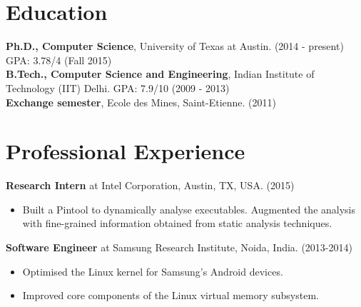 \documentclass[margin]{res}
\begin{document}
 
 
 
\address{Department of Computer Science \\University of Texas at Austin }

\address{+1 512-952-0104 \\ mihir@cs.utexas.edu }

 
\begin{resume} 
 

\section{Education} 
{\bf Ph.D., Computer Science}, University of Texas at Austin. \hfill (2014 - present)\\
GPA: 3.78/4 \hfill (Fall 2015)\\
{\bf B.Tech., Computer Science and Engineering}, Indian Institute of
Technology (IIT) Delhi. GPA: 7.9/10 \hfill (2009 - 2013)\\
{\bf Exchange semester}, Ecole des Mines, Saint-Etienne. \hfill (2011)

\section{Professional Experience}
 
 {\bf Research Intern} at Intel Corporation, Austin, TX, USA. \hfill (2015)
 \begin{itemize} \itemsep -2pt  %
 \item Built a Pintool to dynamically analyse executables. Augmented
   the analysis with fine-grained information obtained from static
   analysis techniques.
 \end{itemize}

 {\bf Software Engineer} at Samsung Research Institute, Noida,
 India. \hfill (2013-2014)
 \begin{itemize} \itemsep -2pt  %
 \item Optimised the Linux kernel for Samsung's
   Android devices.
 \item Improved core components of the Linux virtual memory subsystem.
 \end{itemize}


\end{resume}
\end{document}
